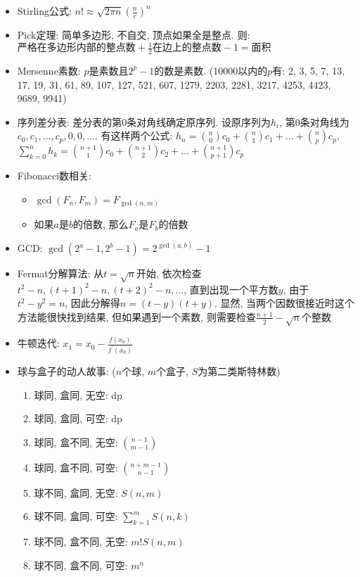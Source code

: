 \documentclass[landscape, twocolumn, 8pt, a4paper, twoside]{extarticle}
\begin{document}
\begin{itemize}
  \item Stirling公式: $n! \approx \sqrt{2 \pi n} (\frac{n}{e})^n$
  \item Pick定理: 简单多边形, 不自交, 顶点如果全是整点. 则: 
        $ \textrm{严格在多边形内部的整点数} + \frac{1}{2} \textrm{在边上的整点数} - 1 = \textrm{面积}$
  \item Mersenne素数: $p$是素数且$2^p-1$的数是素数. (10000以内的$p$有: 2, 3, 5, 7, 13, 17, 19, 31, 61, 89, 107, 127, 521, 607, 1279, 2203, 2281, 3217, 4253, 4423, 9689, 9941)
  \item 序列差分表: 差分表的第$0$条对角线确定原序列. 
      设原序列为$h_i$, 第$0$条对角线为$c_0,c_1,\ldots,c_p,0,0,\ldots$. 
      有这样两个公式: 
      $h_n = \binom{n}{0}c_0 + \binom{n}{1}c_1 + \ldots + \binom{n}{p} c_p$, 
      $\sum_{k = 0}^{n}h_k = \binom{n+1}{1}c_0 + \binom{n+1}{2}c_2 + \ldots + \binom{n+1}{p+1}c_p$
  \item Fibonacci数相关: 
    \begin{itemize}
    \item $\gcd(F_n,F_m)=F_{\gcd(n,m)}$
    \item 如果$a$是$b$的倍数, 那么$F_a$是$F_b$的倍数
    \end{itemize}
  \item GCD:
    $\gcd(2^a-1,2^b-1)=2^{\gcd(a,b)}-1$
  \item Fermat分解算法: 
    从$t=\sqrt{n}$开始, 
    依次检查$t^2-n,(t+1)^2-n,(t+2)^2-n,\ldots$, 
    直到出现一个平方数$y$, 
    由于$t ^ 2 - y ^ 2 = n$, 
    因此分解得$n = (t -y)(t + y)$. 
    显然, 当两个因数很接近时这个方法能很快找到结果, 
    但如果遇到一个素数, 则需要检查$\frac{n + 1}{2} - \sqrt{n}$个整数
  \item 牛顿迭代:
    $x_1 = x_0 - \frac{f(x_0)}{f^\prime(x_0)}$
  \item 球与盒子的动人故事: ($n$个球, $m$个盒子, $S$为第二类斯特林数)
    \begin{enumerate}
    \item 球同, 盒同, 无空: dp
    \item 球同, 盒同, 可空: dp
    \item 球同, 盒不同, 无空: $\binom{n - 1}{m - 1}$
    \item 球同, 盒不同, 可空: $\binom{n + m - 1}{n - 1}$
    \item 球不同, 盒同, 无空: $S(n, m)$
    \item 球不同, 盒同, 可空: $\sum_{k = 1}^{m} S(n, k)$
    \item 球不同, 盒不同, 无空: $m! S(n, m)$
    \item 球不同, 盒不同, 可空: $m^n$

\end{enumerate}
\end{itemize}
\end{document}
